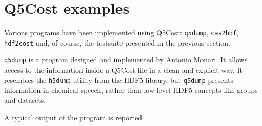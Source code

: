 \section{Q5Cost examples}

Various programs have been implemented using Q5Cost: \texttt{q5dump},
\texttt{cas2hdf}, \texttt{hdf2cost} and, of course, the testsuite presented
in the previous section.

\texttt{q5dump} is a program designed and implemented by Antonio Monari.
It allows access to the information inside a Q5Cost file in a clean and
explicit way. It resembles the \texttt{h5dump} utility from the HDF5
library, but \texttt{q5dump} presents information in chemical speech,
rather than low-level HDF5 concepts like groups and datasets.

A typical output of the program is reported

